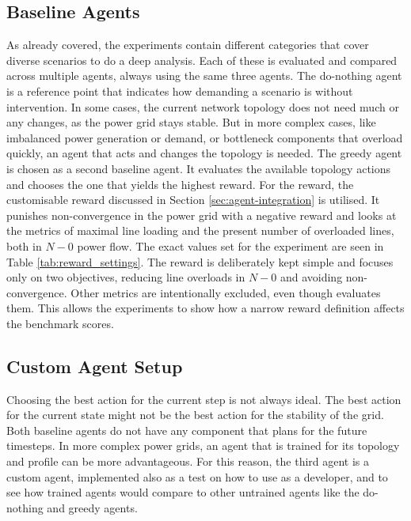 \subsection{Baseline Agents}\label{ssec:baseline-agents}
As already covered, the experiments contain different categories that cover diverse scenarios to do a deep analysis. Each of these is evaluated and compared across multiple agents, always using the same three agents. 
The do-nothing agent is a reference point that indicates how demanding a scenario is without intervention. In some cases, the current network topology does not need much or any changes, as the power grid stays stable. 
But in more complex cases, like imbalanced power generation or demand, or bottleneck components that overload quickly, an agent that acts and changes the topology is needed. The greedy agent is chosen as a second baseline agent. It evaluates the available topology actions and chooses the one that yields the highest reward. 
For the reward, the customisable reward discussed in Section \ref{sec:agent-integration} is utilised. It punishes non-convergence in the power grid with a negative reward and looks at the metrics of maximal line loading and the present number of overloaded lines, both in $N-0$ power flow. The exact values set for the experiment are seen in Table \ref{tab:reward_settings}. The reward is deliberately kept simple and focuses only on two objectives, reducing line overloads in $N-0$ and avoiding non-convergence. Other metrics are intentionally excluded, even though \benchmark evaluates them. This allows the experiments to show how a narrow reward definition affects the benchmark scores. 

\subsection{Custom Agent Setup}\label{ssec:custom-agent-setup}
Choosing the best action for the current step is not always ideal. The best action for the current state might not be the best action for the stability of the grid. Both baseline agents do not have any component that plans for the future timesteps. In more complex power grids, an agent that is trained for its topology and profile can be more advantageous. For this reason, the third agent is a custom agent, implemented also as a test on how to use \benchmark as a developer, and to see how trained agents would compare to other untrained agents like the do-nothing and greedy agents.

